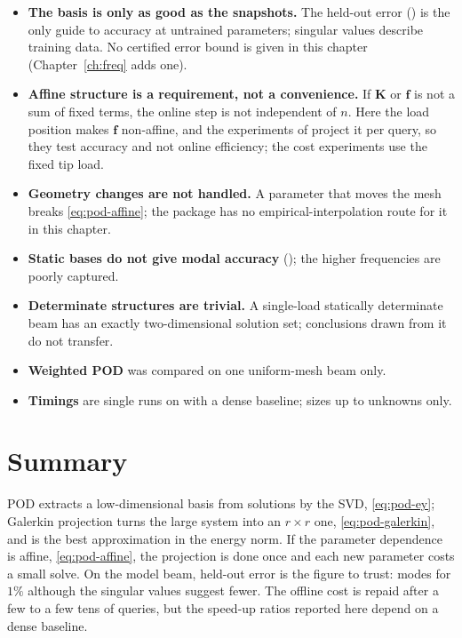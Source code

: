 \begin{limitsbox}
\begin{itemize}
\item \textbf{The basis is only as good as the snapshots.} The held-out error () is the only guide to accuracy at untrained parameters; singular values describe training data. No certified error bound is given in this chapter (Chapter~\ref{ch:freq} adds one).
\item \textbf{Affine structure is a requirement, not a convenience.} If $\bm K$ or $\bm f$ is not a sum of fixed terms, the online step is not independent of $n$. Here the load position makes $\bm f$ non-affine, and the experiments of  project it per query, so they test accuracy and not online efficiency; the cost experiments use the fixed tip load.
\item \textbf{Geometry changes are not handled.} A parameter that moves the mesh breaks \cref{eq:pod-affine}; the package has no empirical-interpolation route for it in this chapter.
\item \textbf{Static bases do not give modal accuracy} (); the higher frequencies are poorly captured.
\item \textbf{Determinate structures are trivial.} A single-load statically determinate beam has an exactly two-dimensional solution set; conclusions drawn from it do not transfer.
\item \textbf{Weighted POD} was compared on one uniform-mesh beam only.
\item \textbf{Timings} are single runs on \machine{} with a dense baseline; sizes up to \cpdBigNf unknowns only.
\end{itemize}
\end{limitsbox}

\section{Summary}\label{sec:pod-summary}

POD extracts a low-dimensional basis from solutions by the SVD, \cref{eq:pod-ey}; Galerkin projection turns the large system into an $r\times r$ one, \cref{eq:pod-galerkin}, and is the best approximation in the energy norm. If the parameter dependence is affine, \cref{eq:pod-affine}, the projection is done once and each new parameter costs a small solve. On the model beam, held-out error is the figure to trust: \cpdModesForOnePct modes for $1\%$ although the singular values suggest fewer. The offline cost is repaid after a few to a few tens of queries, but the speed-up ratios reported here depend on a dense baseline.

